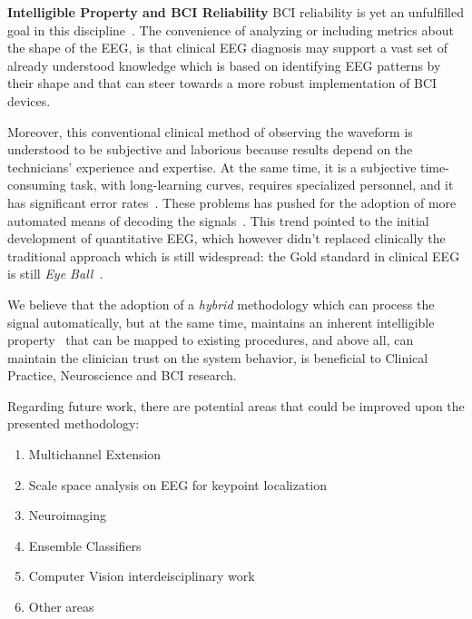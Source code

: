 
\textbf{Intelligible Property and BCI Reliability}
BCI reliability is yet an unfulfilled goal in this discipline~\cite{WolpawJonathanR2012}. The convenience of analyzing or including metrics about the shape of the EEG, is that clinical EEG diagnosis may support a vast set of already understood knowledge which is based on identifying EEG patterns by their shape and that can steer towards a more robust implementation of BCI devices.  


Moreover, this conventional clinical method of observing the waveform is understood to be subjective and laborious because results depend on the technicians' experience and expertise.   At the same time, it is a subjective time-consuming task, with long-learning curves, requires specialized personnel, and it has significant error rates~\cite{Tjepkema-Cloostermans2018}.  These problems has pushed for the adoption of more automated means of decoding the signals~\cite{Thakor2004}.   This trend pointed to the initial development of quantitative EEG, which however didn't replaced clinically the traditional approach which is still widespread: the Gold standard in clinical EEG is still \textit{Eye Ball}~\cite{Wulsin2011,Tjepkema-Cloostermans2018}.  

We believe that the adoption of a \textit{hybrid} methodology which can process the signal automatically, but at the same time, maintains an inherent intelligible property~\cite{j2018challenge} that can be mapped to existing procedures, and above all, can maintain the clinician trust on the system behavior, is beneficial to Clinical Practice, Neuroscience and BCI research. 



\vspace{7pt}

Regarding future work, there are potential areas that could be improved upon the presented methodology:

\begin{enumerate}
\item Multichannel Extension
\item Scale space analysis on EEG for keypoint localization
\item Neuroimaging
\item Ensemble Classifiers
\item Computer Vision interdeisciplinary work
\item Other areas
\end{enumerate}

